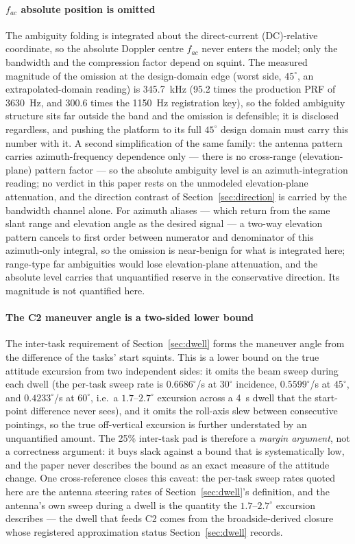 \documentclass[preprint,authoryear]{elsarticle}
\begin{document}
\paragraph{$f_{ac}$ absolute position is omitted} The ambiguity folding is integrated about the direct-current (DC)-relative coordinate, so the absolute Doppler centre $f_{ac}$ never enters the model; only the bandwidth and the compression factor depend on squint. The measured magnitude of the omission at the design-domain edge (worst side, $45^{\circ}$, an extrapolated-domain reading) is 345.7~kHz (95.2 times the production PRF of 3630~Hz, and 300.6 times the 1150~Hz registration key), so the folded ambiguity structure sits far outside the band and the omission is defensible; it is disclosed regardless, and pushing the platform to its full $45^{\circ}$ design domain must carry this number with it. A second simplification of the same family: the antenna pattern carries azimuth-frequency dependence only --- there is no cross-range (elevation-plane) pattern factor --- so the absolute ambiguity level is an azimuth-integration reading; no verdict in this paper rests on the unmodeled elevation-plane attenuation, and the direction contrast of Section~\ref{sec:direction} is carried by the bandwidth channel alone. For azimuth aliases --- which return from the same slant range and elevation angle as the desired signal --- a two-way elevation pattern cancels to first order between numerator and denominator of this azimuth-only integral, so the omission is near-benign for what is integrated here; range-type far ambiguities would lose elevation-plane attenuation, and the absolute level carries that unquantified reserve in the conservative direction. Its magnitude is not quantified here.

\paragraph{The C2 maneuver angle is a two-sided lower bound} The inter-task requirement of Section~\ref{sec:dwell} forms the maneuver angle from the difference of the tasks' start squints. This is a lower bound on the true attitude excursion from two independent sides: it omits the beam sweep during each dwell (the per-task sweep rate is $0.6686^{\circ}$/s at $30^{\circ}$ incidence, $0.5599^{\circ}$/s at $45^{\circ}$, and $0.4233^{\circ}$/s at $60^{\circ}$, i.e.\ a $1.7$--$2.7^{\circ}$ excursion across a 4~s dwell that the start-point difference never sees), and it omits the roll-axis slew between consecutive pointings, so the true off-vertical excursion is further understated by an unquantified amount. The 25\% inter-task pad is therefore a \emph{margin argument}, not a correctness argument: it buys slack against a bound that is systematically low, and the paper never describes the bound as an exact measure of the attitude change. One cross-reference closes this caveat: the per-task sweep rates quoted here are the antenna steering rates of Section~\ref{sec:dwell}'s definition, and the antenna's own sweep during a dwell is the quantity the $1.7$--$2.7^{\circ}$ excursion describes --- the dwell that feeds C2 comes from the broadside-derived closure whose registered approximation status Section~\ref{sec:dwell} records.
\end{document}
